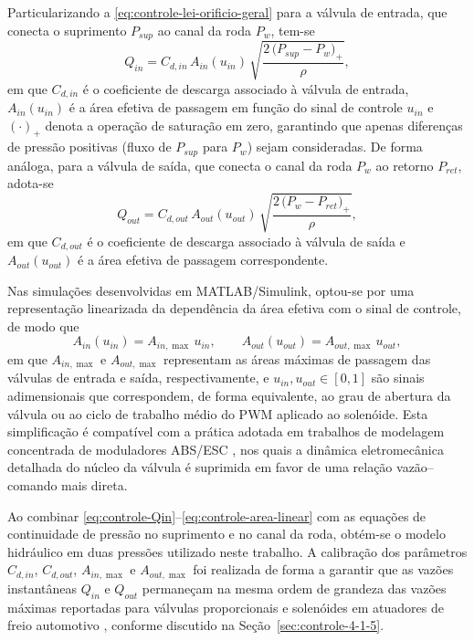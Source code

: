 Particularizando a \eqref{eq:controle-lei-orificio-geral} para a válvula de entrada, que conecta o suprimento $P_{sup}$ ao canal da roda $P_w$, tem-se
\begin{equation}
    Q_{in} = C_{d,in}\,A_{in}(u_{in})\,\sqrt{\frac{2\,\big(P_{sup} - P_w\big)_{+}}{\rho}},
    \label{eq:controle-Qin}
\end{equation}
em que $C_{d,in}$ é o coeficiente de descarga associado à válvula de entrada, $A_{in}(u_{in})$ é a área efetiva de passagem em função do sinal de controle $u_{in}$ e $(\cdot)_{+}$ denota a operação de saturação em zero, garantindo que apenas diferenças de pressão positivas (fluxo de $P_{sup}$ para $P_w$) sejam consideradas. De forma análoga, para a válvula de saída, que conecta o canal da roda $P_w$ ao retorno $P_{ret}$, adota-se
\begin{equation}
    Q_{out} = C_{d,out}\,A_{out}(u_{out})\,\sqrt{\frac{2\,\big(P_{w} - P_{ret}\big)_{+}}{\rho}},
    \label{eq:controle-Qout}
\end{equation}
em que $C_{d,out}$ é o coeficiente de descarga associado à válvula de saída e $A_{out}(u_{out})$ é a área efetiva de passagem correspondente.

Nas simulações desenvolvidas em MATLAB/Simulink, optou-se por uma representação linearizada da dependência da área efetiva com o sinal de controle, de modo que
\begin{equation}
    A_{in}(u_{in}) = A_{in,\max}\,u_{in}, \qquad
    A_{out}(u_{out}) = A_{out,\max}\,u_{out},
    \label{eq:controle-area-linear}
\end{equation}
em que $A_{in,\max}$ e $A_{out,\max}$ representam as áreas máximas de passagem das válvulas de entrada e saída, respectivamente, e $u_{in},u_{out} \in [0,1]$ são sinais adimensionais que correspondem, de forma equivalente, ao grau de abertura da válvula ou ao ciclo de trabalho médio do PWM aplicado ao solenóide. Esta simplificação é compatível com a prática adotada em trabalhos de modelagem concentrada de moduladores ABS/ESC \cite{Lv2014,ChenLv2017}, nos quais a dinâmica eletromecânica detalhada do núcleo da válvula é suprimida em favor de uma relação vazão–comando mais direta.

Ao combinar \eqref{eq:controle-Qin}–\eqref{eq:controle-area-linear} com as equações de continuidade de pressão no suprimento e no canal da roda, obtém-se o modelo hidráulico em duas pressões utilizado neste trabalho. A calibração dos parâmetros $C_{d,in}$, $C_{d,out}$, $A_{in,\max}$ e $A_{out,\max}$ foi realizada de forma a garantir que as vazões instantâneas $Q_{in}$ e $Q_{out}$ permaneçam na mesma ordem de grandeza das vazões máximas reportadas para válvulas proporcionais e solenóides em atuadores de freio automotivo \cite{ProportionalPressureABS2023,ChenLv2017}, conforme discutido na Seção~\ref{sec:controle-4-1-5}.

